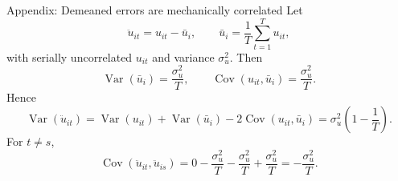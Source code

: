 \documentclass[10pt]{beamer}
\DeclareMathOperator{\Cov}{Cov}
\DeclareMathOperator{\Var}{Var}
\begin{document}
\begin{frame}{Appendix: Demeaned errors are mechanically correlated}
\label{app:demeanedproof}
\small
Let
\[
\ddot{u}_{it} = u_{it}-\bar{u}_i,
\qquad
\bar{u}_i = \frac{1}{T}\sum_{t=1}^T u_{it},
\]
with serially uncorrelated $u_{it}$ and variance $\sigma_u^2$. Then
\[
\Var(\bar{u}_i) = \frac{\sigma_u^2}{T},
\qquad
\Cov(u_{it}, \bar{u}_i) = \frac{\sigma_u^2}{T}.
\]
Hence
\[
\Var(\ddot{u}_{it})
=
\Var(u_{it})+\Var(\bar{u}_i)-2\Cov(u_{it},\bar{u}_i)
= \sigma_u^2\left(1-\frac{1}{T}\right).
\]
For $t \neq s$,
\[
\Cov(\ddot{u}_{it}, \ddot{u}_{is})
=
0 - \frac{\sigma_u^2}{T} - \frac{\sigma_u^2}{T} + \frac{\sigma_u^2}{T}
= -\frac{\sigma_u^2}{T}.
\]
\hfill\hyperlink{slide:demeanedcorr}{}
\end{frame}
\end{document}
